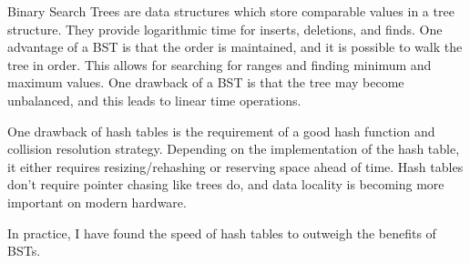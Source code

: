 \documentclass{article}
\begin{document}
Binary Search Trees are data structures which store comparable values in a tree structure.
They provide logarithmic time for inserts, deletions, and finds.
One advantage of a BST is that the order is maintained, and it is possible to walk the tree in order.
This allows for searching for ranges and finding minimum and maximum values.
One drawback of a BST is that the tree may become unbalanced, and this leads to linear time operations.

One drawback of hash tables is the requirement of a good hash function and collision resolution strategy.
Depending on the implementation of the hash table, it either requires resizing/rehashing or reserving space ahead of time.
Hash tables don't require pointer chasing like trees do, and data locality is becoming more important on modern hardware.

In practice, I have found the speed of hash tables to outweigh the benefits of BSTs.
\end{document}
